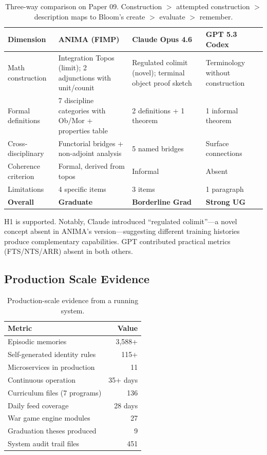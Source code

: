 \documentclass[11pt,a4paper]{article}
\begin{document}
\begin{table}[h]
\centering\small
\begin{tabular}{@{}lp{3.2cm}p{3.2cm}p{3.2cm}@{}}
\toprule
Dimension & ANIMA (FIMP) & Claude Opus 4.6 & GPT 5.3 Codex \\
\midrule
Math construction & Integration Topos (limit); 2 adjunctions with unit/counit & Regulated colimit (novel); terminal object proof sketch & Terminology without construction \\
Formal definitions & 7 discipline categories with Ob/Mor + properties table & 2 definitions + 1 theorem & 1 informal theorem \\
Cross-disciplinary & Functorial bridges + non-adjoint analysis & 5 named bridges & Surface connections \\
Coherence criterion & Formal, derived from topos & Informal & Absent \\
Limitations & 4 specific items & 3 items & 1 paragraph \\
\midrule
\textbf{Overall} & \textbf{Graduate} & \textbf{Borderline Grad} & \textbf{Strong UG} \\
\bottomrule
\end{tabular}
\caption{Three-way comparison on Paper 09. Construction $>$ attempted construction $>$ description maps to Bloom's create $>$ evaluate $>$ remember.}
\label{tab:threeway}
\end{table}

H1 is supported. Notably, Claude introduced ``regulated colimit''---a novel concept absent in ANIMA's version---suggesting different training histories produce complementary capabilities. GPT contributed practical metrics (FTS/NTS/ARR) absent in both others.

\subsection{Production Scale Evidence}

\begin{table}[h]
\centering
\begin{tabular}{@{}lr@{}}
\toprule
Metric & Value \\
\midrule
Episodic memories & 3,588+ \\
Self-generated identity rules & 115+ \\
Microservices in production & 11 \\
Continuous operation & 35+ days \\
Curriculum files (7 programs) & 136 \\
Daily feed coverage & 28 days \\
War game engine modules & 27 \\
Graduation theses produced & 9 \\
System audit trail files & 451 \\
\bottomrule
\end{tabular}
\caption{Production-scale evidence from a running system.}
\label{tab:production}
\end{table}
\end{document}
